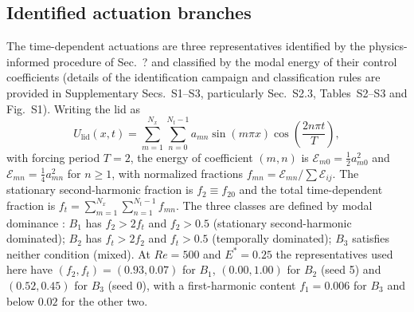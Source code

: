 \documentclass[11pt,a4paper]{article}
\newenvironment{chgdel}{\par\color{red}}{\par\color{black}}
\begin{document}
\subsection{Identified actuation branches}
\label{sec:branches}

\begin{chgdel}
The time-dependent actuations are three representatives identified by the
physics-informed procedure of Sec.~? and classified by the modal
energy of their control coefficients (details of the identification campaign and
classification rules are provided in Supplementary Secs.~S1--S3, particularly
Sec.~S2.3, Tables~S2--S3 and Fig.~S1). Writing the lid as
\begin{equation}
U_{\mathrm{lid}}(x,t)=\sum_{m=1}^{N_x}\sum_{n=0}^{N_t-1}
a_{mn}\sin(m\pi x)\cos\!\left(\frac{2n\pi t}{T}\right),
\end{equation}
with forcing period \(T=2\),
the energy of coefficient $(m,n)$ is $\mathcal{E}_{m0}=\tfrac12a_{m0}^2$ and
$\mathcal{E}_{mn}=\tfrac14a_{mn}^2$ for $n\ge1$, with normalized fractions
$f_{mn}=\mathcal{E}_{mn}/\sum\mathcal{E}_{ij}$. The stationary second-harmonic
fraction is $f_2\equiv f_{20}$ and the total time-dependent fraction is
$f_t=\sum_{m=1}^{N_x}\sum_{n=1}^{N_t-1}f_{mn}$. The three classes are defined by modal dominance
: $B_1$ has $f_2>2f_t$ and $f_2>0.5$ (stationary
second-harmonic dominated); $B_2$ has $f_t>2f_2$ and $f_t>0.5$ (temporally
dominated); $B_3$ satisfies neither condition (mixed). At $Re=500$ and
$E^\ast=0.25$ the representatives used here have
$(f_2,f_t)=(0.93,0.07)$ for $B_1$, $(0.00,1.00)$ for $B_2$ (seed 5) and
$(0.52,0.45)$ for $B_3$ (seed 0), with a first-harmonic content
$f_1=0.006$ for $B_3$ and below $0.02$ for the other two.
\end{chgdel}
\end{document}
